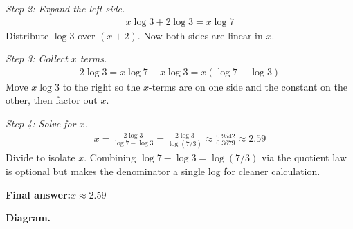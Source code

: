 \documentclass[11pt]{article}
\begin{document}
\textit{Step 2: Expand the left side.}
\[\begin{gathered}
x\log 3 + 2\log 3 = x\log 7
\end{gathered}\]
Distribute \( \log 3 \) over \( (x+2) \). Now both sides are linear in \( x \).

\textit{Step 3: Collect \( x \) terms.}
\[\begin{gathered}
2\log 3 = x\log 7 - x\log 3 = x(\log 7 - \log 3)
\end{gathered}\]
Move \( x\log 3 \) to the right so the \( x \)-terms are on one side and the constant on the other, then factor out \( x \).

\textit{Step 4: Solve for \( x \).}
\[\begin{gathered}
x = \frac{2\log 3}{\log 7 - \log 3} = \frac{2\log 3}{\log(7/3)} \approx \frac{0.9542}{0.3679} \approx 2.59
\end{gathered}\]
Divide to isolate \( x \). Combining \( \log 7 - \log 3 = \log(7/3) \) via the quotient law is optional but makes the denominator a single log for cleaner calculation.

\begin{answerbox}
\textbf{Final answer:}\quad \(\displaystyle  x \approx 2.59 \)
\end{answerbox}
\textbf{Diagram.}
\end{document}

